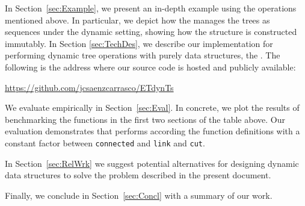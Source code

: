 In Section~\ref{sec:Example}, we present an in-depth example using the operations mentioned above. In particular, we depict how the \dyntset manages the trees as sequences under the dynamic setting, showing how the \dyntset structure is constructed immutably. In Section \ref{sec:TechDes}, we describe our implementation for performing dynamic tree operations with purely data structures, the \dyntset. The following is the address where our source code is hosted and publicly available:
\begin{center}
\url{https://github.com/jcsaenzcarrasco/ETdynTs}
\end{center}

We evaluate \dyntset empirically in Section~\ref{sec:Eval}. In concrete, we plot the results of benchmarking the functions in the first two sections of the table above. Our evaluation demonstrates that \dyntset performs according the function definitions with a constant factor between \texttt{connected} and \texttt{link} and \texttt{cut}. 

In Section~\ref{sec:RelWrk} we suggest potential alternatives for designing dynamic data structures to solve the problem described in the present document. 

Finally, we conclude in Section~\ref{sec:Concl} with a summary of our work.



